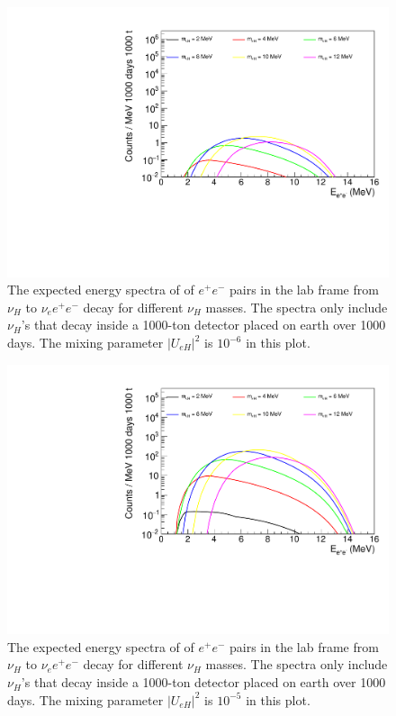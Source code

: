 \documentclass[%
 reprint,
 amsmath,amssymb,
 aps,
 prd,
floatfix,
twocolumn,
]{revtex4-1}
\begin{document}
\begin{figure}[!htbp]
\includegraphics[width=0.99\columnwidth]{../plots/EeeSpectrum_decay_in_detector_integrate_U1e-06_AllMass_linXlogY.pdf}
\caption{The expected energy spectra of of $e^+e^-$ pairs in the lab frame from $\nu_H$ to $\nu_e e^+ e^-$ decay for  different $\nu_H$ masses. 
The spectra only include $\nu_H$'s that decay inside a 1000-ton detector placed on earth over 1000 days. 
The mixing parameter $|U_{eH}|^2$ is  $10^{-6}$ in this plot.}
\label{fig:EeeSpectrum_in_detector_U1em6} 
\end{figure}

\begin{figure}[!htbp]
\includegraphics[width=0.99\columnwidth]{../plots/EeeSpectrum_decay_in_detector_integrate_U1e-05_AllMass_linXlogY.pdf}
\caption{The expected energy spectra of of $e^+e^-$ pairs in the lab frame from $\nu_H$ to $\nu_e e^+ e^-$ decay for  different $\nu_H$ masses. 
The spectra only include $\nu_H$'s that decay inside a 1000-ton detector placed on earth over 1000 days. 
The mixing parameter $|U_{eH}|^2$ is  $10^{-5}$ in this plot.}
\label{fig:EeeSpectrum_in_detector_U1em5} 
\end{figure}
\end{document}
